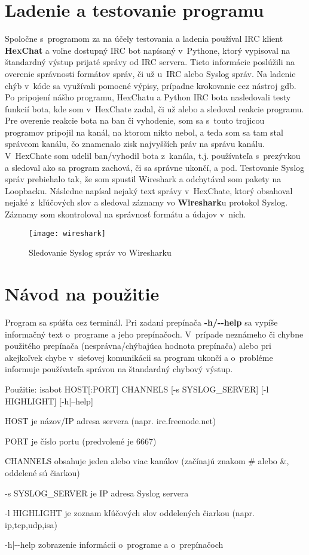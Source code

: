\chapter{Ladenie a testovanie programu}
Spoločne s~programom za na účely testovania a ladenia používal IRC klient \textbf{HexChat} a voľne dostupný IRC bot napísaný v~Pythone, ktorý vypisoval na štandardný výstup prijaté správy od IRC servera. Tieto informácie poslúžili na overenie správnosti formátov správ, či už u~IRC alebo Syslog správ. Na ladenie chýb v~kóde sa využívali pomocné výpisy, prípadne krokovanie cez nástroj gdb. Po pripojení nášho programu, HexChatu a Python IRC bota nasledovali testy funkcií bota, kde som v~HexChate zadal, či už  alebo  a sledoval reakcie programu. Pre overenie reakcie bota na ban či vyhodenie, som sa s~touto trojicou programov pripojil na kanál, na ktorom nikto nebol, a teda som sa tam stal správcom kanálu, čo znamenalo zisk najvyšších práv na správu kanálu. V~HexChate som udelil ban/vyhodil bota z~kanála, t.j. používateľa s~prezývkou  a sledoval ako sa program zachová, či sa správne ukončí, a pod. Testovanie Syslog správ prebiehalo tak, že som spustil Wireshark a odchytával som pakety na Loopbacku. Následne napísal nejaký text správy v~HexChate, ktorý obsahoval nejaké z~kľúčových slov a sledoval záznamy vo \textbf{Wireshark}u protokol Syslog. Záznamy som skontroloval na správnosť formátu a údajov v~nich.

\begin{figure}[h]
	\texttt{[image: wireshark]}
	\caption{Sledovanie Syslog správ vo Wiresharku}
\end{figure}


\chapter{Návod na použitie}

Program sa spúšťa cez terminál. Pri zadaní prepínača \textbf{-h/-{}-help} sa vypíše informačný text o~programe a jeho prepínačoch. V~prípade neznámeho či chybne použitého prepínača (nesprávna/chýbajúca hodnota prepínača) alebo pri akejkoľvek chybe v~sieťovej komunikácii sa program ukončí a o~probléme informuje používateľa správou na štandardný chybový výstup.

\begin{framed}
Použitie: isabot HOST[:PORT] CHANNELS [-s SYSLOG\_SERVER] [-l HIGHLIGHT] [-h|--help]

HOST je názov/IP adresa servera (napr. irc.freenode.net)

PORT je číslo portu (predvolené je 6667)

CHANNELS obsahuje jeden alebo viac kanálov (začínajú znakom \# alebo \&, oddelené sú čiarkou)

-s SYSLOG\_SERVER je IP adresa Syslog servera

-l HIGHLIGHT je zoznam kľúčových slov oddelených čiarkou (napr. ip,tcp,udp,isa)

-h|-{}-help zobrazenie informácii o~programe a o~prepínačoch
\end{framed}

